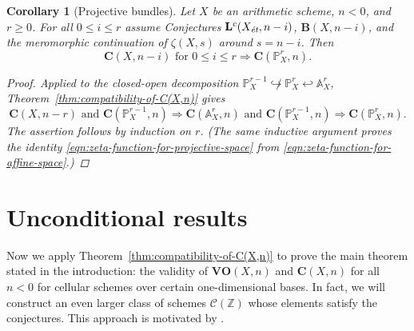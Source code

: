 \documentclass[10pt,a4paper,oneside]{article}
\newcommand{\ZZ}{\mathbb{Z}}
\renewcommand{\AA}{\mathbb{A}}
\newcommand{\PP}{\mathbb{P}}
\newcommand{\et}{\text{\it \'{e}t}}
\theoremstyle{myplain}
\newtheorem{corollary}[theorem]{Corollary}
\theoremstyle{mydefinition}
\numberwithin{equation}{section}
\begin{document}
\begin{corollary}[Projective bundles]
  Let $X$ be an arithmetic scheme, $n < 0$, and $r \ge 0$.
  For all $0 \le i \le r$ assume Conjectures $\mathbf{L}^c (X_\et,n-i)$,
  $\mathbf{B} (X,n-i)$, and the meromorphic continuation of $\zeta (X,s)$ around
  $s = n-i$. Then
  \[ \mathbf{C} (X,n-i)\text{ for }0 \le i \le r \Longrightarrow
    \mathbf{C} (\PP_X^r, n). \]

  \begin{proof}
    Applied to the closed-open decomposition
    $\PP_X^{r-1} \not\hookrightarrow \PP_X^r \hookleftarrow \AA_X^r$,
    Theorem~\ref{thm:compatibility-of-C(X,n)} gives
    \[ \mathbf{C} (X, n-r) \text{ and } \mathbf{C} (\PP_X^{r-1}, n)
      \Longrightarrow
      \mathbf{C} (\AA_X^r, n) \text{ and } \mathbf{C} (\PP_X^{r-1}, n)
      \Longrightarrow
      \mathbf{C} (\PP_X^r,n). \]
    The assertion follows by induction on $r$.
    (The same inductive argument proves the identity
    \eqref{eqn:zeta-function-for-projective-space} from
    \eqref{eqn:zeta-function-for-affine-space}.)
    \end{proof}
\end{corollary}


\section{Unconditional results}
\label{sec:unconditional-results}

Now we apply Theorem~\ref{thm:compatibility-of-C(X,n)} to prove the main theorem
stated in the introduction: the validity of $\mathbf{VO} (X,n)$ and
$\mathbf{C} (X,n)$ for all $n < 0$ for cellular schemes over certain
one-dimensional bases. In fact, we will construct an even larger class of
schemes $\mathcal{C} (\ZZ)$ whose elements satisfy the conjectures. This
approach is motivated by \cite[\S 5]{Morin-2014}.
\end{document}

